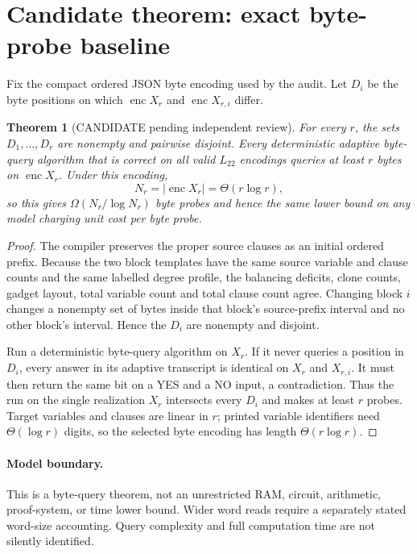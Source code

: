 \documentclass[11pt]{article}
\newtheorem{theorem}{Theorem}
\newcommand{\Ltwo}{L_{22}}
\begin{document}
\section{Candidate theorem: exact byte-probe baseline}
Fix the compact ordered JSON byte encoding used by the audit.  Let $D_i$ be
the byte positions on which $\operatorname{enc}X_r$ and
$\operatorname{enc}X_{r,i}$ differ.

\begin{theorem}[CANDIDATE pending independent review]\label{thm:blockprobe}
For every $r$, the sets $D_1,\ldots,D_r$ are nonempty and pairwise disjoint.
Every deterministic adaptive byte-query algorithm that is correct on all
valid $\Ltwo$ encodings queries at least $r$ bytes on
$\operatorname{enc}X_r$.  Under this encoding,
\[
  N_r=|\operatorname{enc}X_r|=\Theta(r\log r),
\]
so this gives $\Omega(N_r/\log N_r)$ byte probes and hence the same lower
bound on any model charging unit cost per byte probe.
\end{theorem}

\begin{proof}
The compiler preserves the proper source clauses as an initial ordered prefix.
Because the two block templates have the same source variable and clause
counts and the same labelled degree profile, the balancing deficits, clone
counts, gadget layout, total variable count and total clause count agree.
Changing block $i$ changes a nonempty set of bytes inside that block's
source-prefix interval and no other block's interval.  Hence the $D_i$ are
nonempty and disjoint.

Run a deterministic byte-query algorithm on $X_r$.  If it never queries a
position in $D_i$, every answer in its adaptive transcript is identical on
$X_r$ and $X_{r,i}$.  It must then return the same bit on a YES and a NO input,
a contradiction.  Thus the run on the single realization $X_r$ intersects
every $D_i$ and makes at least $r$ probes.  Target variables and clauses are
linear in $r$; printed variable identifiers need $\Theta(\log r)$ digits, so
the selected byte encoding has length $\Theta(r\log r)$.
\end{proof}

\paragraph{Model boundary.}
This is a byte-query theorem, not an unrestricted RAM, circuit, arithmetic,
proof-system, or time lower bound.  Wider word reads require a separately
stated word-size accounting.  Query complexity and full computation time are
not silently identified.
\end{document}
